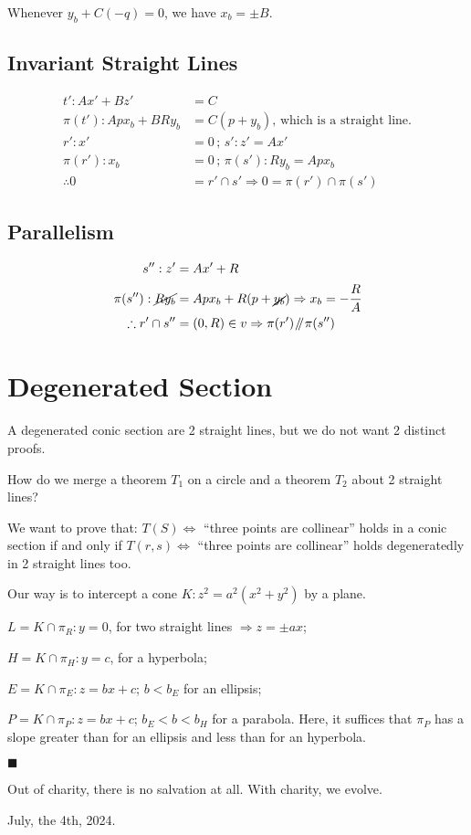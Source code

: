 \documentclass[12pt]{article}
\numberwithin{table}{section}
\newcommand{\isParallel}{\mathbin{\!/\mkern-5mu/\!}}
\begin{document}
Whenever $y_b + C(-q) = 0$, we have $x_b = \pm B$.

\subsection{Invariant Straight Lines}

\begin{align}
t': Ax' + Bz' &= C \\
\pi(t'): A px_b + B R y_b &= C(p + y_b)\text{, which is a straight line.} \\
r': x' &= 0\,;\,s': z' = Ax' \\
\pi(r'): x_b &= 0\,;\,\pi(s'): Ry_b = Ap x_b\\ 
\therefore 0 &= r' \cap s' \Rightarrow 0 = \pi(r') \cap \pi(s')
\end{align}

\subsection{Parallelism}

\begin{align}
s'': z' &= Ax' + R \\
\pi(s''): \cancel{Ry_b} &= Ap x_b + R(p + \cancel{y_b}) \Rightarrow x_b = - \cfrac{R}{A} \\
\therefore r' \cap s'' &= (0,R) \in v \Rightarrow \pi(r') \isParallel \pi(s'')
\end{align}

\section{Degenerated Section}

A degenerated conic section are 2 straight lines, but we do not want 2 distinct proofs. 

How do we merge a theorem $T_1$ on a circle and a theorem $T_2$ about 2 straight lines?

We want to prove that: $T(S)\Leftrightarrow$ ``three points are collinear'' holds in a conic section if and only if $T(r,s)\Leftrightarrow$ ``three points are collinear'' holds degeneratedly in 2 straight lines too.

Our way is to intercept a cone $K:z^2 = a^2(x^2 + y^2)$ by a plane.

$L = K\cap \pi_R: y = 0$, for two straight lines $\Rightarrow z = \pm ax$;

$H = K\cap \pi_H: y = c$, for a hyperbola;

$E = K\cap \pi_E: z = bx + c$; $b < b_E$ for an ellipsis;

$P = K\cap \pi_P: z = bx + c$; $b_E < b < b_H$ for a parabola. Here, it suffices that $\pi_P$ has a slope greater than for an ellipsis and less than for an hyperbola.

$\blacksquare$

\vspace{12mm}

Out of charity, there is no salvation at all. With charity, we evolve.

July, the 4th, 2024.

%
\end{document}
